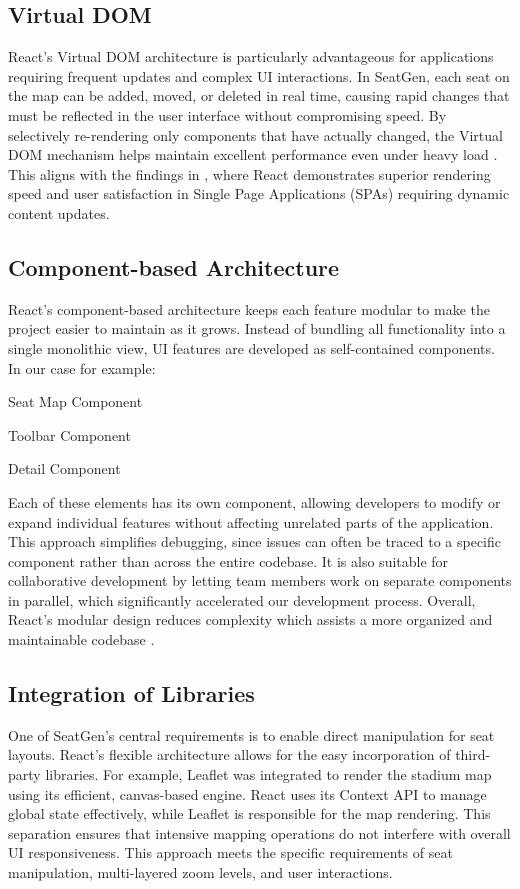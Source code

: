 \subsection{Virtual DOM}
React’s Virtual DOM architecture is particularly advantageous for applications requiring frequent updates and complex UI interactions. In SeatGen, each seat on the map can be added, moved, or deleted in real time, causing rapid changes that must be reflected in the user interface without compromising speed. By selectively re-rendering only components that have actually changed, the Virtual DOM mechanism helps maintain excellent performance even under heavy load \cite{ReactVirtualDOM}. This aligns with the findings in \cite{SPAComp}, where React demonstrates superior rendering speed and user satisfaction in Single Page Applications (SPAs) requiring dynamic content updates.

\subsection{Component-based Architecture}
React’s component-based architecture keeps each feature modular to make the project easier to maintain as it grows. Instead of bundling all functionality into a single monolithic view, UI features are developed as self-contained components. In our case for example:
\begin{compactitem}
    \item Seat Map Component
    \item Toolbar Component
    \item Detail Component
\end{compactitem}
Each of these elements has its own component, allowing developers to modify or expand individual features without affecting unrelated parts of the application. This approach simplifies debugging, since issues can often be traced to a specific component rather than across the entire codebase. It is also suitable for collaborative development by letting team members work on separate components in parallel, which significantly accelerated our development process. Overall, React’s modular design reduces complexity which assists a more organized and maintainable codebase \cite{ReactCBA01, ReactCBA02, ReactCBA03}.

\subsection{Integration of Libraries}
One of SeatGen’s central requirements is to enable direct manipulation for seat layouts. React’s flexible architecture allows for the easy incorporation of third-party libraries. For example, Leaflet was integrated to render the stadium map using its efficient, canvas-based engine. React uses its Context API to manage global state effectively, while Leaflet is responsible for the map rendering. This separation ensures that intensive mapping operations do not interfere with overall UI responsiveness. This approach meets the specific requirements of seat manipulation, multi-layered zoom levels, and user interactions.

